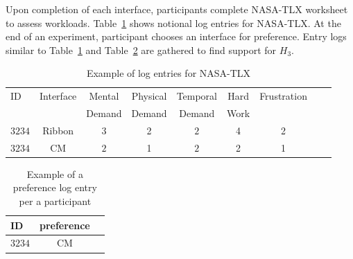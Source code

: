 \documentclass{article}
\begin{document}
Upon completion of each interface, participants complete NASA-TLX worksheet to assess workloads. Table~\ref{fig:nasa_log} shows notional log entries for NASA-TLX. At the end of an experiment, participant chooses an interface for preference. Entry logs similar to Table~\ref{fig:nasa_log} and Table~\ref{fig:pref_log} are gathered to find support for $H_3$.   
\begin{table}[tbh]
  \centering
\begin{tabular}{|l|c|c|c|c|c|c|c|c|}
  \hline
  ID &  Interface  & Mental 	&  Physical 	 &Temporal  	& Hard  & Frustration      \\      
       &                  & Demand	& Demand 	& Demand 	& Work		     &			\\\hline
$3234$ &   Ribbon  & $3$  & 2  & $2$ & 4  &2  \\ \hline
$3234$  &    CM &   $2$ & 1  & $2$ & 2 &1  \\\hline       
\end{tabular}
\caption{Example of log entries for NASA-TLX}
\label{fig:nasa_log}
\end{table}

\begin{table}[tbh]
  \centering
\begin{tabular}{|l|c|c|}
  \hline
    ID               & preference                \\\hline
 $3234$ &   CM      \\ \hline
\end{tabular}
\caption{Example of a  preference log entry per a participant}
\label{fig:pref_log}
\end{table}


\end{document}
